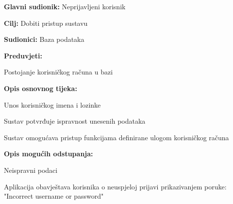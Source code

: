 					\noindent {}
					\begin{packed_item}
						\item \textbf{Glavni sudionik:} Neprijavljeni korisnik
						\item  \textbf{Cilj:} Dobiti pristup sustavu
						\item  \textbf{Sudionici:} Baza podataka
						\item  \textbf{Preduvjeti:}
						\item[] \begin{packed_enum}
							\item Postojanje korisničkog računa u bazi
						\end{packed_enum}
						
						\item  \textbf{Opis osnovnog tijeka:}
						\item[] \begin{packed_enum}
							\item Unos korisničkog imena i lozinke
							\item Sustav potvrđuje ispravnost unesenih podataka
							\item Sustav omogućava pristup funkcijama definirane ulogom korisničkog računa
						\end{packed_enum}
						
						\item  \textbf{Opis mogućih odstupanja:}
						\item[] \begin{packed_item}
							\item[2.a] Neispravni podaci
							\item[] \begin{packed_enum}
								\item Aplikacija obavještava korisnika o neuspjeloj prijavi prikazivanjem poruke: "Incorrect username or password"
									\end{packed_enum}
						\end{packed_item}
					\end{packed_item}
					
